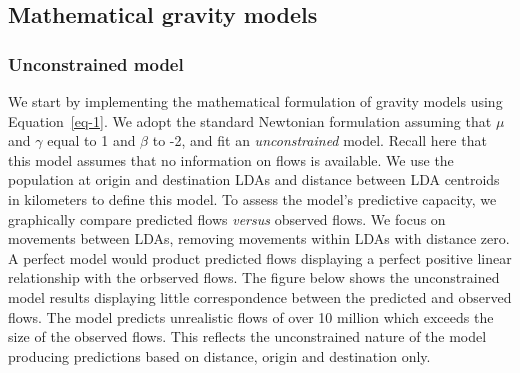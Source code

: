 \documentclass[
  a4paper, 
  twoside,
  final
]{article}
\begin{document}
\hypertarget{mathematical-gravity-models}{%
\subsection{Mathematical gravity
models}\label{mathematical-gravity-models}}

\hypertarget{unconstrained-model}{%
\subsubsection{Unconstrained model}\label{unconstrained-model}}

We start by implementing the mathematical formulation of gravity models
using Equation~\ref{eq-1}. We adopt the standard Newtonian formulation
assuming that \(\mu\) and \(\gamma\) equal to 1 and \(\beta\) to -2, and
fit an \emph{unconstrained} model. Recall here that this model assumes
that no information on flows is available. We use the population at
origin and destination LDAs and distance between LDA centroids in
kilometers to define this model. To assess the model's predictive
capacity, we graphically compare predicted flows \emph{versus} observed
flows. We focus on movements between LDAs, removing movements within
LDAs with distance zero. A perfect model would product predicted flows
displaying a perfect positive linear relationship with the orbserved
flows. The figure below shows the unconstrained model results displaying
little correspondence between the predicted and observed flows. The
model predicts unrealistic flows of over 10 million which exceeds the
size of the observed flows. This reflects the unconstrained nature of
the model producing predictions based on distance, origin and
destination only.
\end{document}
